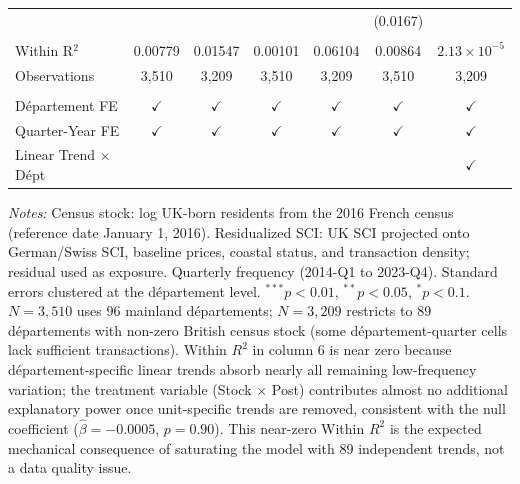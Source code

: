 \begin{table}[htbp]
\begin{tabular}{lcccccc}
                                             &               &                &               &                & (0.0167)      &   \\
       \\
      Within R$^2$                           & 0.00779       & 0.01547        & 0.00101       & 0.06104        & 0.00864       & $2.13\times 10^{-5}$\\
      Observations                           & 3,510         & 3,209          & 3,510         & 3,209          & 3,510         & 3,209\\
       \\
      D\'{e}partement FE                     & $\checkmark$  & $\checkmark$   & $\checkmark$  & $\checkmark$   & $\checkmark$  & $\checkmark$\\
      Quarter-Year FE                        & $\checkmark$  & $\checkmark$   & $\checkmark$  & $\checkmark$   & $\checkmark$  & $\checkmark$\\
      Linear Trend $\times$ D\'{e}pt         &               &                &               &                &               & $\checkmark$\\
      \bottomrule
   \end{tabular}
   \par\vspace{0.5em}\noindent\footnotesize{\textit{Notes:} Census stock: log UK-born residents from the 2016 French census (reference date January 1, 2016). Residualized SCI: UK SCI projected onto German/Swiss SCI, baseline prices, coastal status, and transaction density; residual used as exposure. Quarterly frequency (2014-Q1 to 2023-Q4). Standard errors clustered at the d\'{e}partement level. $^{***}p<0.01$, $^{**}p<0.05$, $^{*}p<0.1$. $N=3{,}510$ uses 96 mainland d\'{e}partements; $N=3{,}209$ restricts to 89 d\'{e}partements with non-zero British census stock (some d\'{e}partement-quarter cells lack sufficient transactions). Within $R^2$ in column 6 is near zero because d\'{e}partement-specific linear trends absorb nearly all remaining low-frequency variation; the treatment variable (Stock $\times$ Post) contributes almost no additional explanatory power once unit-specific trends are removed, consistent with the null coefficient ($\hat{\beta} = -0.0005$, $p = 0.90$). This near-zero Within $R^2$ is the expected mechanical consequence of saturating the model with 89 independent trends, not a data quality issue.}
\end{table}
